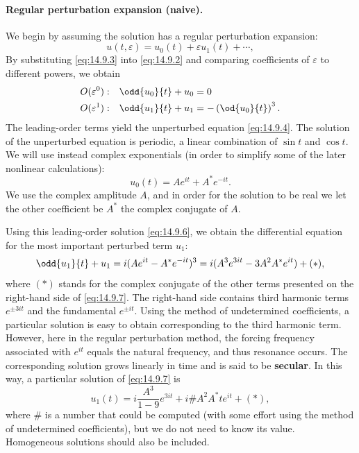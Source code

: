 \paragraph{Regular perturbation expansion (naive).}
We begin by assuming the solution has a regular perturbation expansion:
\begin{equation}
u(t, \varepsilon) = u_0(t) + \varepsilon u_1(t) + \cdots,
\label{eq:14.9.3}
\end{equation}
By substituting \eqref{eq:14.9.3} into \eqref{eq:14.9.2} and comparing coefficients of $\varepsilon$ to different powers, we obtain
\begin{align}
O(\varepsilon^0): \quad &\odd{u_0}{t} + u_0 = 0 \label{eq:14.9.4} \\
O(\varepsilon^1): \quad &\odd{u_1}{t} + u_1 = -\left(\od{u_0}{t}\right)^3. \label{eq:14.9.5}
\end{align}
The leading-order terms yield the unperturbed equation \eqref{eq:14.9.4}. The solution of the unperturbed equation is periodic, a linear combination of $\sin t$ and $\cos t$. We will use instead complex exponentials (in order to simplify some of the later nonlinear calculations):
\begin{equation}
u_0(t) = Ae^{it} + A^*e^{-it}.
\label{eq:14.9.6}
\end{equation}
We use the complex amplitude $A$, and in order for the solution to be real we let the other coefficient be $A^*$ the complex conjugate of $A$.

Using this leading-order solution \eqref{eq:14.9.6}, we obtain the differential equation for the most important perturbed term $u_1$:
\begin{equation}
\odd{u_1}{t} + u_1 = i(Ae^{it} - A^*e^{-it})^3 = i(A^3e^{3it} - 3A^2A^*e^{it}) + (*),
\label{eq:14.9.7}
\end{equation}
where $(*)$ stands for the complex conjugate of the other terms presented on the right-hand side of \eqref{eq:14.9.7}. The right-hand side contains third harmonic terms $e^{\pm 3it}$ and the fundamental $e^{\pm it}$. Using the method of undetermined coefficients, a particular solution is easy to obtain corresponding to the third harmonic term. However, here in the regular perturbation method, the forcing frequency associated with $e^{it}$ equals the natural frequency, and thus resonance occurs. The corresponding solution grows linearly in time and is said to be \textbf{secular}. In this way, a particular solution of \eqref{eq:14.9.7} is
\[
u_1(t) = i\frac{A^3}{1-9}e^{3it} + i\#A^2A^*te^{it} + (*),
\]
where $\#$ is a number that could be computed (with some effort using the method of undetermined coefficients), but we do not need to know its value. Homogeneous solutions should also be included.

